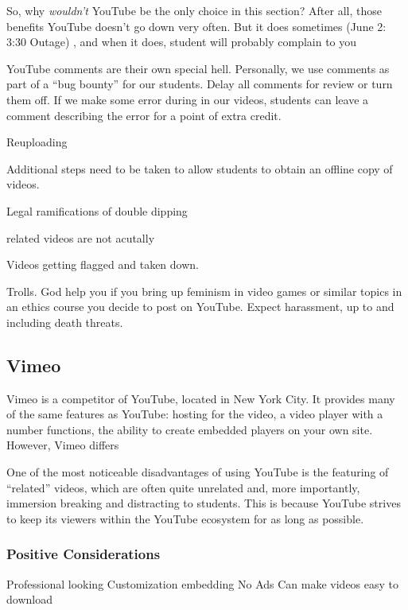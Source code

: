 \documentclass[sigconf]{acmart}
\begin{document}
So, why \textit{wouldn't} YouTube be the only choice in this section?
After all, those benefits  
YouTube doesn't go down very often.  
But it does sometimes \cite{outage2018} (June 2: 3:30 Outage) \cite{outage2019}, and when it does, student will probably complain to you 

YouTube comments are their own special hell.
Personally, we use comments as part of a ``bug bounty'' for our students.
Delay all comments for review or turn them off.
If we make some error during in our videos, students can leave a comment describing the error for a point of extra credit.

Reuploading

Additional steps need to be taken to allow students to obtain an offline copy of videos.

Legal ramifications of double dipping

related videos are not acutally 


Videos getting flagged and taken down.

Trolls.  God help you if you bring up feminism in video games or similar topics in an ethics course you decide to post on YouTube.  Expect harassment, up to and including death threats. %

\subsection{Vimeo}
Vimeo is a competitor of YouTube, located in New York City.
It provides many of the same features as YouTube: hosting for the video, a video player with a number functions, the ability to create embedded players on your own site.
However, Vimeo differs 


One of the most noticeable disadvantages of using YouTube is the featuring of ``related'' videos, which are often quite unrelated and, more importantly, immersion breaking and distracting to students.
This is because YouTube strives to keep its viewers within the YouTube ecosystem for as long as possible.



\subsubsection{Positive Considerations}
Professional looking
Customization embedding
No Ads
Can make videos easy to download
\end{document}
